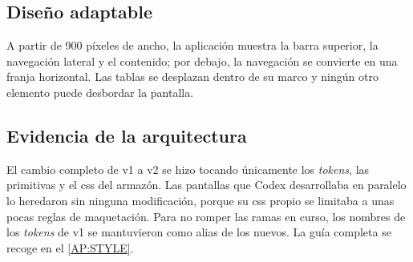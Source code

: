 \subsection{Diseño adaptable}

A partir de 900 píxeles de ancho, la aplicación muestra la barra superior, la navegación
lateral y el contenido; por debajo, la navegación se convierte en una franja horizontal.
Las tablas se desplazan dentro de su marco y ningún otro elemento puede desbordar la
pantalla.

\subsection{Evidencia de la arquitectura}

El cambio completo de v1 a v2 se hizo tocando únicamente los \textit{tokens}, las
primitivas y el \acs{css} del armazón. Las pantallas que Codex desarrollaba en paralelo lo
heredaron sin ninguna modificación, porque su \acs{css} propio se limitaba a unas pocas
reglas de maquetación. Para no romper las ramas en curso, los nombres de los
\textit{tokens} de v1 se mantuvieron como alias de los nuevos. La guía completa se recoge en
el \cref{AP:STYLE}.
